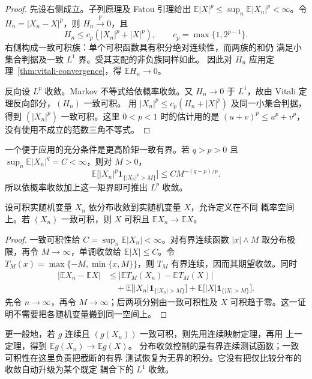 \begin{proof}
先设右侧成立。子列原理及 Fatou 引理给出
$\mathbb E|X|^p\le\sup_n\mathbb E|X_n|^p<\infty$。令
$H_n=|X_n-X|^p$，则 $H_n\xrightarrow{\mathbb P}0$，且
\[
 H_n\le c_p(|X_n|^p+|X|^p),\qquad c_p=\max\{1,2^{p-1}\}.
\]
右侧构成一致可积族：单个可积函数具有积分绝对连续性，而两族的和仍
满足小集合判据及一致 $L^1$ 界。受其支配的非负族同样如此。
因此对 $H_n$ 应用定理~\ref{thm:vitali-convergence}，得
$\mathbb E H_n\to0$。

反向设 $L^p$ 收敛。Markov 不等式给依概率收敛。又
$H_n\to0$ 于 $L^1$，故由 Vitali 定理反向部分，$(H_n)$ 一致可积。
用
$|X_n|^p\le c_p(H_n+|X|^p)$ 及同一小集合判据，得到
$(|X_n|^p)$ 一致可积。这里 $0<p<1$ 时的估计用的是
$(u+v)^p\le u^p+v^p$，没有使用不成立的范数三角不等式。
\end{proof}

一个便于应用的充分条件是更高阶矩一致有界。若 $q>p>0$ 且
$\sup_n\mathbb E|X_n|^q=C<\infty$，则对 $M>0$，
\[
 \mathbb E\bigl[|X_n|^p\mathbf1_{\{|X_n|^p>M\}}\bigr]
 \le C M^{-(q-p)/p}.
\]
所以依概率收敛加上这一矩界即可推出 $L^p$ 收敛。

\begin{theorem}[分布收敛下的期望极限]
\label{thm:weak-ui-expectations}
设可积实随机变量 $X_n$ 依分布收敛到实随机变量 $X$，允许定义在不同
概率空间上。若 $(X_n)$ 一致可积，则 $X$ 可积且
$\mathbb E X_n\to\mathbb E X$。
\end{theorem}

\begin{proof}
一致可积性给 $C=\sup_n\mathbb E|X_n|<\infty$。对有界连续函数
$|x|\wedge M$ 取分布极限，再令 $M\to\infty$，单调收敛给
$\mathbb E|X|\le C$。令 $T_M(x)=\max\{-M,\min\{x,M\}\}$，则
$T_M$ 有界连续，因而其期望收敛。同时
\begin{align*}
 |\mathbb E X_n-\mathbb E X|
 &\le |\mathbb E T_M(X_n)-\mathbb E T_M(X)|\\
 &\quad+\mathbb E\bigl[|X_n|\mathbf1_{\{|X_n|>M\}}\bigr]
       +\mathbb E\bigl[|X|\mathbf1_{\{|X|>M\}}\bigr].
\end{align*}
先令 $n\to\infty$，再令 $M\to\infty$；后两项分别由一致可积性及 $X$
可积趋于零。这一证明不需要把各随机变量搬到同一空间上。
\end{proof}

更一般地，若 $g$ 连续且 $(g(X_n))$ 一致可积，则先用连续映射定理，再用
上一定理，得到 $\mathbb E g(X_n)\to\mathbb E g(X)$。
分布收敛控制的是有界连续测试函数；一致可积性在这里负责把截断的有界
测试恢复为无界的积分。它没有把仅比较分布的收敛自动升级为某个既定
耦合下的 $L^1$ 收敛。

